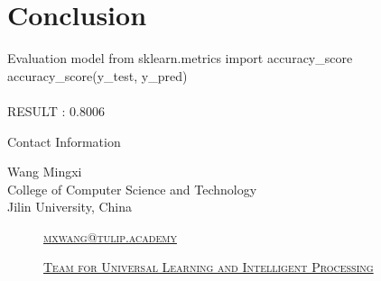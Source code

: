 \documentclass[
 size=14pt,
 paper=smartboard,  %
 mode=present, 		%
 display=slides, 	%
 style=tuliplab,  	%
 pauseslide,
 fleqn,leqno]{powerdot}
\begin{document}
\section{Conclusion}

\begin{slide}[toc=,bm=]{Evaluation model}
from sklearn.metrics import accuracy\_score\\
accuracy\_score(y\_test, y\_pred)\\
\\
RESULT : 0.8006\\

\end{slide}









\begin{wideslide}[toc=,bm=]{Contact Information}
\centering
{}
\twocolumn[
lcolwidth=0.35\linewidth,
rcolwidth=0.65\linewidth
]
{
}
{
Wang Mingxi\\
College of Computer Science and Technology\\
Jilin University, China
\begin{description}
 \item[\textcolor{orange}{\faEnvelope}] \href{mailto:mxwang@tulip.academy}
 {\textsc{\footnotesize{mxwang@tulip.academy}}}

 \item[\textcolor{orange}{\faHome}] \href{http://www.tulip.org.au}
 {\textsc{\footnotesize{Team for Universal Learning and Intelligent Processing}}}
\end{description}
}
\end{wideslide}
\end{document}
